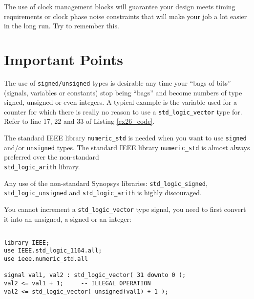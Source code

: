 The use of clock management blocks will guarantee your design meets timing requirements or clock phase noise constraints that will make your job a lot easier in the long run. Try to remember this.

\section{Important Points}

\begin{my_list}
\item The use of \texttt{signed/unsigned} types is desirable any time your ``bags of bits'' (signals, variables or constants) stop being ``bags'' and become numbers of type signed, unsigned or even integers. A typical example is the variable used for a counter for which there is really no reason to use a \texttt{std\_logic\_vector} type for. Refer to line 17, 22 and 33 of Listing \ref{ex26_code}.

\item The standard IEEE library \texttt{numeric\_std} is needed when you want to use \texttt{signed} and/or \texttt{unsigned} types. The standard IEEE library \texttt{numeric\_std} is almost always preferred over the non-standard\\ \texttt{std\_logic\_arith} library.
\item Any use of the non-standard Synopsys libraries: \texttt{std\_logic\_signed}, \texttt{std\_logic\_unsigned} and \texttt{std\_logic\_arith} is highly discouraged.
\item You cannot increment a \texttt{std\_logic\_vector} type signal, you need to first convert it into an unsigned, a signed or an integer:

\noindent
\begin{minipage}{0.99\linewidth}
\begin{lstlisting}

library IEEE;
use IEEE.std_logic_1164.all;
use ieee.numeric_std.all

signal val1, val2 : std_logic_vector( 31 downto 0 );
val2 <= val1 + 1;     -- ILLEGAL OPERATION 
val2 <= std_logic_vector( unsigned(val1) + 1 );
\end{lstlisting}
\end{minipage}

\end{my_list}

